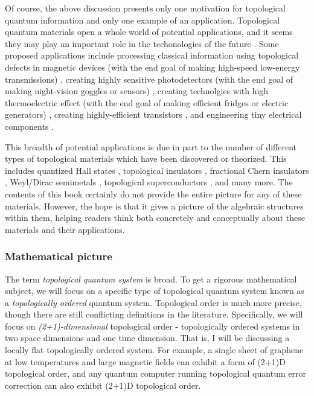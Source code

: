 Of course, the above discussion presents only one motivation for topological quantum information and only one example of an application. Topological quantum materials open a whole world of potential applications, and it seems they may play an important role in the techonologies of the future \cite{ramirez2020dawn}. Some proposed applications include processing classical information using topological defects in magnetic devices (with the end goal of making high-speed low-energy transmissions) \cite{marrows2021perspective, vsmejkal2018topological}, creating highly sensitive photodetectors (with the end goal of making night-vision goggles or sensors) \cite{chan2017photocurrents}, creating technolgies with high thermoelectric effect (with the end goal of making efficient fridges or electric generators) \cite{skinner2018large}, creating highly-efficient transistors \cite{fuhrer2021proposal}, and engineering tiny electrical components \cite{viola2014hall, placke2017model}. 

This breadth of potential applications is due in part to the number of different types of topological materials which have been discovered or theorized. This includes quantized Hall states \cite{von202040}, topological insulators \cite{hasan2010colloquium}, fractional Chern insulators \cite{regnault2011fractional}, Weyl/Dirac semimetals \cite{armitage2018weyl}, topological superconductors \cite{sato2017topological}, and many more. The contents of this book certainly do not provide the entire picture for any of these materials. However, the hope is that it gives a picture of the algebraic structures within them, helping readers think both concretely and conceptually about these materials and their applications.

\subsubsection{Mathematical picture}

The term \textit{topological quantum system} is broad. To get a rigorous mathematical subject, we will focus on a specific type of topological quantum system known as a \textit{topologically ordered} quantum system. Topological order is much more precise, though there are still conflicting definitions in the literature. Specifically, we will focus on \textit{(2+1)-dimensional} topological order - topologically ordered systems in two space dimensions and one time dimension. That is, I will be discussing a locally flat topologically ordered system. For example, a single sheet of graphene at low temperatures and large magnetic fields can exhibit a form of (2+1)D topological order, and any quantum computer running topological quantum error correction can also exhibit (2+1)D topological order.

